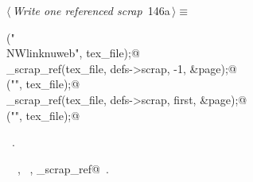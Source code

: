 \documentclass[a4paper]{report}
\begin{document}
\begin{flushleft} \small
\begin{minipage}{\linewidth}\label{scrap318}\raggedright\small
{} $\langle\,${\it Write one referenced scrap}\nobreak\ {\footnotesize {146a}}$\,\rangle\equiv$
\vspace{-1ex}
\begin{list}{}{} \item
\mbox{}\verb@fputs("\\NWlink{nuweb", tex_file);@\\
\mbox{}\verb@write_scrap_ref(tex_file, defs->scrap, -1, &page);@\\
\mbox{}\verb@fputs("}{", tex_file);@\\
\mbox{}\verb@write_scrap_ref(tex_file, defs->scrap, first, &page);@\\
\mbox{}\verb@fputs("}", tex_file);@{\NWsep}
\end{list}
\vspace{-1.5ex}
\footnotesize
\begin{list}{}{\setlength{\itemsep}{-\parsep}\setlength{\itemindent}{-\leftmargin}}
\item \NWtxtMacroRefIn\ .
\item \NWtxtIdentsUsed\nobreak\  \verb@first@\nobreak\ , \verb@fputs@\nobreak\ , \verb@write_scrap_ref@\nobreak\ .
\item{}
\end{list}
\end{minipage}\vspace{4ex}
\end{flushleft}
\end{document}
